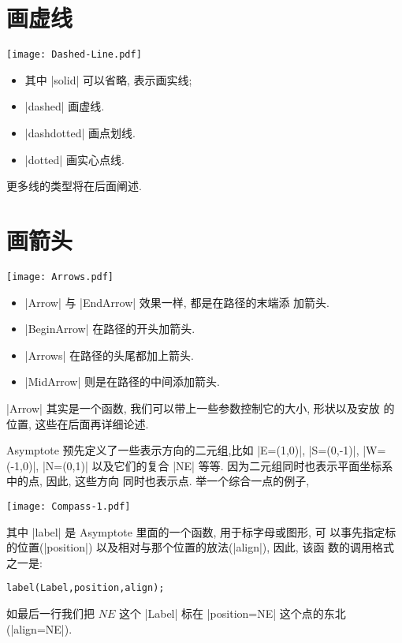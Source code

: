 \documentclass{ctexbook}
\begin{document}
\section{画虚线}
\begin{center}\texttt{[image: Dashed-Line.pdf]}\end{center}%

\begin{itemize}
\item  其中 |solid| 可以省略, 表示画实线; 
\item |dashed| 画虚线.
\item |dashdotted| 画点划线.
\item |dotted| 画实心点线.  
\end{itemize}
更多线的类型将在后面阐述.

\section{画箭头}
\begin{center}\texttt{[image: Arrows.pdf]}\end{center}%


\begin{itemize}
\item |Arrow| 与 |EndArrow| 效果一样, 都是在路径的末端添
  加箭头.
\item |BeginArrow| 在路径的开头加箭头.
\item |Arrows| 在路径的头尾都加上箭头.
\item |MidArrow| 则是在路径的中间添加箭头.
\end{itemize}
|Arrow| 其实是一个函数, 我们可以带上一些参数控制它的大小, 形状以及安放
的位置, 这些在后面再详细论述.

Asymptote 预先定义了一些表示方向的二元组,比如  |E=(1,0)|,
|S=(0,-1)|, |W=(-1,0)|, |N=(0,1)| 以及它们的复合
|NE| 等等. 因为二元组同时也表示平面坐标系中的点, 因此, 这些方向
同时也表示点. 举一个综合一点的例子, 

\begin{center}\texttt{[image: Compass-1.pdf]}\end{center}%


其中 |label| 是 Asymptote 里面的一个函数, 用于标字母或图形, 可
以事先指定标的位置(|position|) 以及相对与那个位置的放法(|align|), 因此, 该函
数的调用格式之一是:
\begin{verbatim}
label(Label,position,align);
\end{verbatim}
如最后一行我们把 $NE$ 这个 |Label| 标在 |position=NE| 这个点的东北
(|align=NE|).
\end{document}
